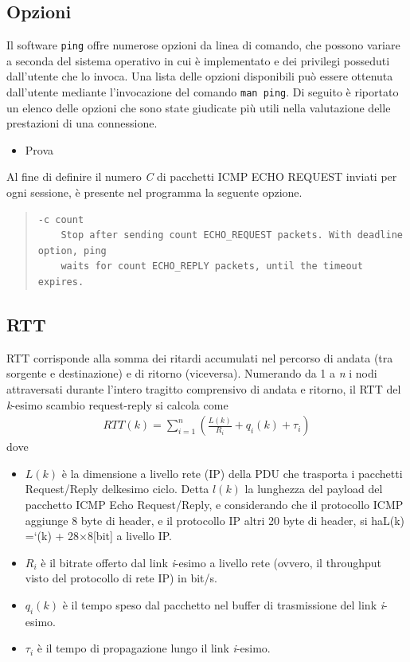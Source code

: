 \documentclass[a4paper,10pt]{article}
\begin{document}
\subsection{Opzioni}
Il software \texttt{ping} offre numerose opzioni da linea di comando, che possono variare a seconda del sistema operativo in cui è implementato e dei privilegi posseduti dall'utente che lo invoca. Una lista delle opzioni disponibili può essere ottenuta dall'utente mediante l'invocazione del comando \texttt{man ping}. Di seguito è riportato un elenco delle opzioni che sono state giudicate più utili nella valutazione delle prestazioni di una connessione.
\begin{itemize}
\item Prova
\end{itemize}
Al fine di definire il numero \textit{C} di pacchetti ICMP ECHO REQUEST inviati per ogni sessione, è presente nel programma la seguente opzione.
\begin{quote}
\begin{verbatim}
-c count
	Stop after sending count ECHO_REQUEST packets. With deadline option, ping 
	waits for count ECHO_REPLY packets, until the timeout expires.
\end{verbatim}
\end{quote}  

\newpage

\printbibliography

\newpage

\subsection{RTT}
RTT corrisponde alla somma dei ritardi accumulati nel percorso di andata (tra sorgente e destinazione) e di ritorno (viceversa). Numerando da 1 a \textit{n} i nodi attraversati durante l'intero tragitto comprensivo di andata e ritorno, il RTT del \textit{k}-esimo scambio request-reply si calcola come
\begin{align*}
RTT(k) = \sum_{i=1}^{n} \left( \frac{L(k)}{R_i} + q_i(k) + \tau_i \right)
\end{align*}
dove
\begin{itemize}
\item $L(k)$ è la dimensione a livello rete (IP) della PDU che trasporta i pacchetti Request/Reply delkesimo ciclo.  Detta $l(k)$ la lunghezza del payload del pacchetto ICMP Echo Request/Reply, e considerando che il protocollo ICMP aggiunge 8 byte di header, e il protocollo IP altri 20 byte di header, si haL(k) =`(k) + 28×8[bit] a livello IP.
\item $R_i$ è il bitrate offerto dal link \textit{i}-esimo a livello rete (ovvero, il throughput visto del protocollo di rete IP) in bit/s.
\item $q_i(k)$ è il tempo speso dal pacchetto nel buffer di trasmissione del link \textit{i}-esimo.
\item $\tau_i$ è il tempo di propagazione lungo il link \textit{i}-esimo.
\end{itemize}
\end{document}

